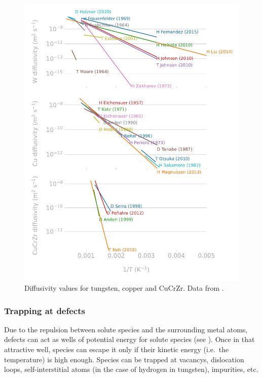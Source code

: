\begin{figure}
    \centering
    \includegraphics[width=0.75\linewidth]{Figures/Chapter1/materials_diffusivity_review_comparison.pdf}
    \caption{Diffusivity values for tungsten, copper and CuCrZr. Data from \cite{delaporte-mathurin_remdelaportemathurinh-transport-materials_2022}.}
\end{figure}

\subsubsection{Trapping at defects}

Due to the repulsion between solute species and the surrounding metal atoms, defects can act as wells of potential energy for solute species (see ).
Once in that attractive well, species can escape it only if their kinetic energy (i.e.\ the temperature) is high enough.
Species can be trapped at \glspl{vacancy}, \glspl{dislocation loop}, \gls{self-interstitial} atoms (in the case of hydrogen in tungsten), impurities, etc.

